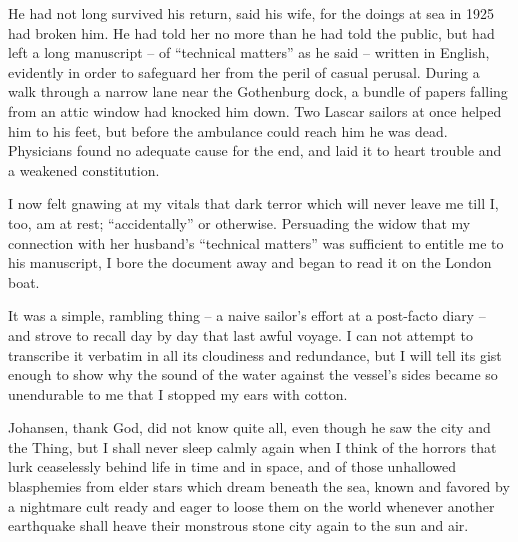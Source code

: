 He had not long survived his return, said his wife, for the doings at sea in 1925 had broken him. He had told her no more than he had told the public, but had left a long manuscript⁠ – of “technical matters” as he said⁠ – written in English, evidently in order to safeguard her from the peril of casual perusal. During a walk through a narrow lane near the Gothenburg dock, a bundle of papers falling from an attic window had knocked him down. Two Lascar sailors at once helped him to his feet, but before the ambulance could reach him he was dead. Physicians found no adequate cause for the end, and laid it to heart trouble and a weakened constitution.

I now felt gnawing at my vitals that dark terror which will never leave me till I, too, am at rest; “accidentally” or otherwise. Persuading the widow that my connection with her husband’s “technical matters” was sufficient to entitle me to his manuscript, I bore the document away and began to read it on the London boat.

It was a simple, rambling thing⁠ – a naive sailor’s effort at a post-facto diary⁠ – and strove to recall day by day that last awful voyage. I can not attempt to transcribe it verbatim in all its cloudiness and redundance, but I will tell its gist enough to show why the sound of the water against the vessel’s sides became so unendurable to me that I stopped my ears with cotton.

Johansen, thank God, did not know quite all, even though he saw the city and the Thing, but I shall never sleep calmly again when I think of the horrors that lurk ceaselessly behind life in time and in space, and of those unhallowed blasphemies from elder stars which dream beneath the sea, known and favored by a nightmare cult ready and eager to loose them on the world whenever another earthquake shall heave their monstrous stone city again to the sun and air.

\sectionbreak

